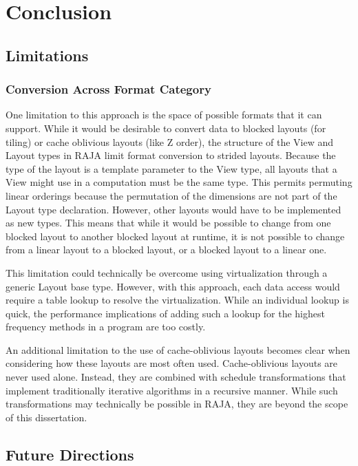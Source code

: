 \chapter{Conclusion}
\label{chap:Conclusion}

\section{Limitations}

\subsection{Conversion Across Format Category}
One limitation to this approach is the space of possible formats that it can support. 
While it would be desirable to convert data to blocked layouts (for tiling) or cache oblivious layouts (like Z order), the structure of the View and Layout types in RAJA limit format conversion to strided layouts. 
Because the type of the layout is a template parameter to the View type, all layouts that a View might use in a computation must be the same type. 
This permits permuting linear orderings because the permutation of the dimensions are not part of the Layout type declaration. 
However, other layouts would have to be implemented as new types. 
This means that while it would be possible to change from one blocked layout to another blocked layout at runtime, it is not possible to change from a linear layout to a blocked layout, or a blocked layout to a linear one.

This limitation could technically be overcome using virtualization through a generic Layout base type. 
However, with this approach, each data access would require a table lookup to resolve the virtualization. 
While an  individual lookup is quick, the performance implications of adding such a lookup for the highest frequency methods in a program are too costly.

An additional limitation to the use of cache-oblivious layouts becomes clear when considering how these layouts are most often used. 
Cache-oblivious layouts are never used alone. 
Instead, they are combined with schedule transformations that implement traditionally iterative algorithms in a recursive manner. 
While such transformations may technically be possible in RAJA, they are beyond the scope of this dissertation.

\section{Future Directions}

